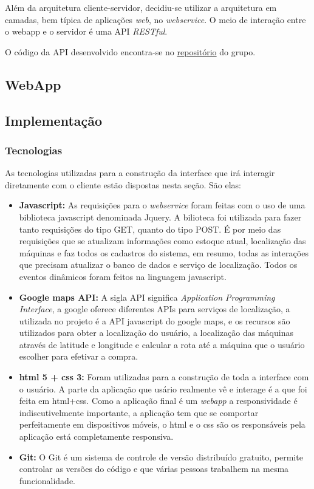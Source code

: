 Além da arquitetura cliente-servidor, decidiu-se utilizar a arquitetura em camadas, bem típica de aplicações \textit{web}, no \textit{webservice}. O meio de interação entre o webapp e o servidor é uma API \textit{RESTful}.

O código da API desenvolvido encontra-se no \href{http://github.com/pi2-picole/api}{repositório} do grupo.


\subsection{WebApp}
\subsection{Implementação}

\subsubsection{Tecnologias}

As tecnologias utilizadas para a construção da interface que irá interagir diretamente com o cliente estão dispostas nesta seção. São elas:

\begin{itemize}
\item \textbf{Javascript:} As requisições para o \textit{webservice} foram feitas com o uso de uma biblioteca javascript denominada Jquery. A bilioteca foi utilizada para fazer tanto requisições do tipo GET, quanto do tipo POST. É por meio das requisições que se atualizam informações como estoque atual, localização das máquinas e faz todos os cadastros do sistema, em resumo, todas as interações que precisam atualizar o banco de dados e serviço de localização. Todos os eventos dinâmicos foram feitos na linguagem javascript.
\item \textbf{Google maps API:} A sigla API significa \textit{Application Programming Interface}, a google oferece diferentes APIs para serviços de localização, a utilizada no projeto é a API javascript do google maps, e os recursos são utilizados para obter a localização do usuário, a localização das máquinas através de latitude e longitude e calcular a rota até a máquina que o usuário escolher para efetivar a compra.
\item\textbf{ html 5 + css 3:} Foram utilizadas para a construção de toda a interface com o usuário. A parte da aplicação que usário realmente vê e interage é a que foi feita em html+css. Como a aplicação final é um \textit{webapp} a responsividade é indiscutivelmente importante, a aplicação tem que se comportar perfeitamente em dispositivos móveis, o html e o css são os responsáveis pela aplicação está completamente responsiva.
\item\textbf{Git:} O Git é um sistema de controle de versão distribuído gratuito, permite controlar as versões do código e que várias pessoas trabalhem na mesma funcionalidade.
\end{itemize}


